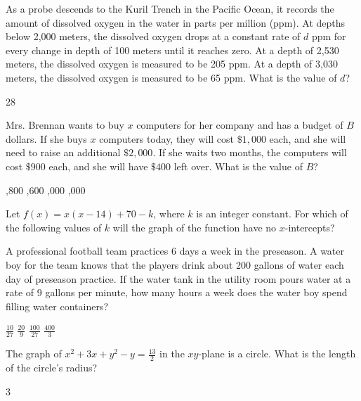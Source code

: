 \newpage





\question[1]
As a probe descends to the Kuril Trench in the Pacific Ocean, it records the amount of dissolved oxygen in the water in parts per million (ppm). At depths below 2,000 meters, the dissolved oxygen drops at a constant rate of $d$ ppm for every change in depth of 100 meters until it reaches zero. At a depth of 2,530 meters, the dissolved oxygen is measured to be 205 ppm. At a depth of 3,030 meters, the dissolved oxygen is measured to be 65 ppm. What is the value of $d$?
\begin{solution}
28
\end{solution}

\question[1]
Mrs. Brennan wants to buy $x$ computers for her company and has a budget of $B$ dollars. If she buys $x$ computers today, they will cost $\$1,000$ each, and she will need to raise an additional $\$2,000$. If she waits two months, the computers will cost $\$900$ each, and she will have $\$400$ left over. What is the value of $B$?
\begin{choices}
  ,800
  ,600
  ,000
  ,000
\end{choices}

\question[1]
Let $f(x) = x(x-14) + 70 - k$, where $k$ is an integer constant. For which of the following values of $k$ will the graph of the function have no $x$-intercepts?
\begin{choices}
\end{choices}

\question[1]
A professional football team practices 6 days a week in the preseason. A water boy for the team knows that the players drink about 200 gallons of water each day of preseason practice. If the water tank in the utility room pours water at a rate of 9 gallons per minute, how many hours a week does the water boy spend filling water containers?
\begin{choices}
  \choice $\frac{10}{27}$
  \CorrectChoice $\frac{20}{9}$
  \choice $\frac{100}{27}$
  \choice $\frac{400}{3}$
\end{choices}

\question[1]
The graph of $x^2 + 3x + y^2 - y = \frac{13}{2}$ in the $xy$-plane is a circle. What is the length of the circle's radius?
\begin{solution}
3
\end{solution}

